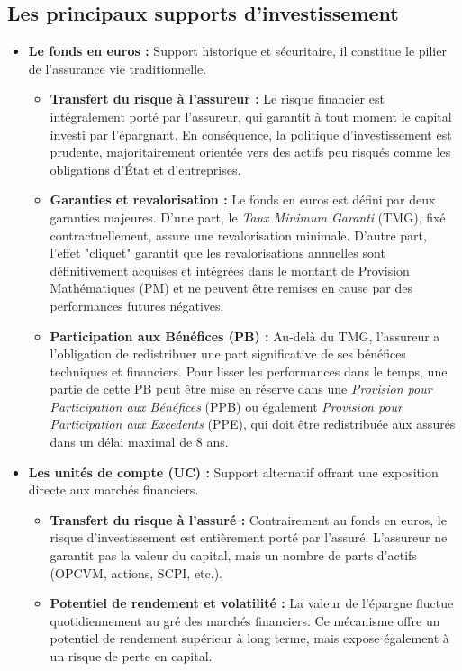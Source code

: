 \subsection{Les principaux supports d'investissement}
\begin{itemize}
    \item \textbf{Le fonds en euros :} Support historique et sécuritaire, il constitue le pilier de l'assurance vie traditionnelle.\newline{}
    \begin{itemize}
        \item \textbf{Transfert du risque à l'assureur :} Le risque financier est intégralement porté par l'assureur, qui garantit à tout moment le capital investi par l'épargnant. En conséquence, la politique d'investissement est prudente, majoritairement orientée vers des actifs peu risqués comme les obligations d'État et d'entreprises. \newline{}
        \item \textbf{Garanties et revalorisation :} Le fonds en euros est défini par deux garanties majeures. D'une part, le \textit{Taux Minimum Garanti} (TMG), fixé contractuellement, assure une revalorisation minimale. D'autre part, l'effet "cliquet" garantit que les revalorisations annuelles sont définitivement acquises et intégrées dans le montant de Provision Mathématiques (PM) et ne peuvent être remises en cause par des performances futures négatives.\newline{}
        \item \textbf{Participation aux Bénéfices (PB) :} Au-delà du TMG, l'assureur a l'obligation de redistribuer une part significative de ses bénéfices techniques et financiers. Pour lisser les performances dans le temps, une partie de cette PB peut être mise en réserve dans une \textit{Provision pour Participation aux Bénéfices} (PPB) ou également \textit{Provision pour Participation aux Excedents} (PPE), qui doit être redistribuée aux assurés dans un délai maximal de 8 ans.\newline{}
    \end{itemize}
    \item \textbf{Les unités de compte (UC) :} Support alternatif offrant une exposition directe aux marchés financiers.\newline{}
    \begin{itemize}
        \item \textbf{Transfert du risque à l'assuré :} Contrairement au fonds en euros, le risque d'investissement est entièrement porté par l'assuré. L'assureur ne garantit pas la valeur du capital, mais un nombre de parts d'actifs (OPCVM, actions, SCPI, etc.).\newline{}
        \item \textbf{Potentiel de rendement et volatilité :} La valeur de l'épargne fluctue quotidiennement au gré des marchés financiers. Ce mécanisme offre un potentiel de rendement supérieur à long terme, mais expose également à un risque de perte en capital.\newline{}
    \end{itemize}
\end{itemize}
\newpage{}
